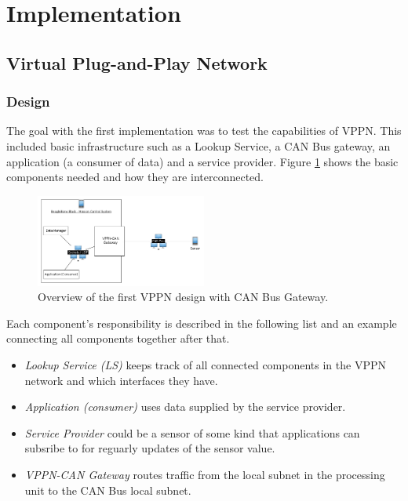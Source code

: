 \section{Implementation}\label{sec:implementation}
\subsection{Virtual Plug-and-Play Network}
\subsubsection{Design}
The goal with the first implementation was to test the capabilities of VPPN.
This included basic infrastructure such as a Lookup Service, a CAN Bus
gateway, an application (a consumer of data) and a service provider. Figure
\ref{fig:vppn-overview} shows the basic components needed and how they are
interconnected.

\begin{figure}[h]
    \includegraphics[width=0.5\textwidth]{./figure/vppn-overview.png}
    \caption{Overview of the first VPPN design with CAN Bus Gateway.}
    \label{fig:vppn-overview}
\end{figure}

Each component's responsibility is described in the following list and an
example connecting all components together after that.
\begin{itemize}
    \item {\em Lookup Service (LS)} keeps track of all connected components in the VPPN
        network and which interfaces they have.
    \item {\em Application (consumer)} uses data supplied by the service
        provider.
    \item {\em Service Provider} could be a sensor of some kind that
        applications can subsribe to for reguarly updates of the sensor value.
    \item {\em VPPN-CAN Gateway} routes traffic from the local subnet in the
        processing unit to the CAN Bus local subnet.
\end{itemize}


